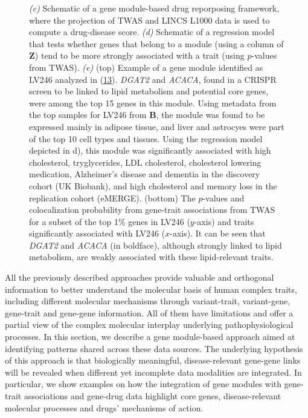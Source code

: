 \begin{figure}
{{\emph{(c)} Schematic of a gene module-based drug reporposing framework, where the projection of TWAS and LINCS L1000 data is used to compute a drug-disease score.
\emph{(d)} Schematic of a regression model that tests whether genes that belong to a module (using a column of \(\mathbf{Z}\)) tend to be more strongly associated with a trait (using \(p\)-values from TWAS).
\emph{(e)} (top) Example of a gene module identified as LV246 analyzed in (\protect\hyperlink{ref-NM3rHx1i}{13}).
\emph{DGAT2} and \emph{ACACA}, found in a CRISPR screen to be linked to lipid metabolism and potential core genes, were among the top 15 genes in this module.
Using metadata from the top samples for LV246 from \(\mathbf{B}\), the module was found to be expressed mainly in adipose tissue, and liver and astrocyes were part of the top 10 cell types and tissues.
Using the regression model depicted in d), this module was significantly associated with high cholesterol, tryglycerides, LDL cholesterol, cholesterol lowering medication, Alzheimer's disease and dementia in the discovery cohort (UK Biobank), and high cholesterol and memory loss in the replication cohort (eMERGE).
(bottom) The \(p\)-values and colocalization probability from gene-trait associations from TWAS for a subset of the top 1\% genes in LV246 (\(y\)-axis) and traits significantly associated with LV246 (\(x\)-axis).
It can be seen that \emph{DGAT2} and \emph{ACACA} (in boldface), although strongly linked to lipid metabolism, are weakly associated with these lipid-relevant traits.}\label{fig:fig4}
}
\end{figure}

All the previously described approaches provide valuable and orthogonal information to better understand the molecular basis of human complex traits, including different molecular mechanisms through variant-trait, variant-gene, gene-trait and gene-gene information.
All of them have limitations and offer a partial view of the complex molecular interplay underlying pathophysiological processes.
In this section, we describe a gene module-based approach aimed at identifying patterns shared across these data sources.
The underlying hypothesis of this approach is that biologically meaningful, disease-relevant gene-gene links will be revealed when different yet incomplete data modalities are integrated.
In particular, we show examples on how the integration of gene modules with gene-trait associations and gene-drug data highlight core genes, disease-relevant molecular processes and drugs' mechanisms of action.

